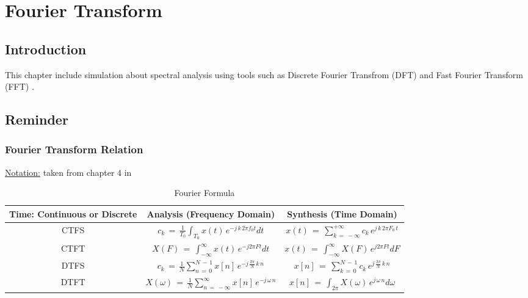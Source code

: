 

\chapter{Fourier Transform}

\section{Introduction}

This chapter include simulation about spectral analysis using tools such as Discrete Fourier Transfrom (DFT)  and Fast Fourier Transform (FFT) .

\section{Reminder}

\subsection{Fourier Transform Relation}

\underline{Notation:} taken from chapter 4 in \cite{DSP_DimitrisManolakis}

\begin{table}[!h]
	\centering
\begin{tabular}{|c|c|c|} \hline

Time: Continuous or Discrete & Analysis (Frequency Domain) & Synthesis (Time Domain) \\ \hline
CTFS & $c_k \, = \, \displaystyle\frac{1}{T_0} \displaystyle\int_{T_0} x(t) \, e^{-j  \, k \, 2 \pi f_0 t} dt$ 	& $x(t) \, = \, \displaystyle\sum_{k \, = \, - \infty}^{+ \infty} c_k \, e^{j \, k \, 2 \pi F_0 \, t}$   \\ \hline
CTFT & $X(F) \, = \, \displaystyle\int_{-\infty}^\infty x(t) \, e^{-j 2\pi F t} dt $	& $x(t) \, = \, \displaystyle\int_{-\infty}^\infty X(F) \, e^{j 2\pi F t} dF $ \\ \hline
DTFS    & $c_k \, = \, \displaystyle\frac{1}{N} \displaystyle\sum_{n \, = \, 0}^{N \, - \, 1} x[n] \, e^{-j  \, \frac{2 \pi}{N} \, k \,n} $ & $x[n] \, = \, \displaystyle\sum_{k \, = \, 0}^{N \, - \, 1} c_k \, e^{j  \, \frac{2 \pi}{N} \, k \,n}$ \\ \hline
DTFT    & $X(\omega) \, = \, \displaystyle\frac{1}{N} \displaystyle\sum_{n \, = \, - \infty}^{\infty} x[n] \, e^{-j  \, \omega \,n} $ & $x[n] \, = \, \displaystyle\int_{2 \pi} X(\omega) \, e^{j  \, \omega \,n} d \omega$ \\ \hline
\end{tabular}
\caption{Fourier Formula}
\label{Tb:Fourier_Processing:Fourier_Relation}
\end{table} 


